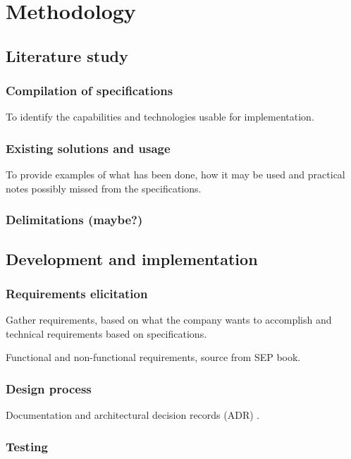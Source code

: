\chapter{Methodology}

\section{Literature study}

\subsection{Compilation of specifications}

To identify the capabilities and technologies usable for
implementation.

\subsection{Existing solutions and usage}

To provide examples of what has been done, how it may be used and
practical notes possibly missed from the specifications.

\subsection{Delimitations (maybe?)}

\section{Development and implementation}

\subsection{Requirements elicitation}

Gather requirements, based on what the company wants to
accomplish and technical requirements based on specifications.

Functional and non-functional requirements, source from 
SEP book.

\subsection{Design process}

Documentation and architectural decision records (ADR)
\cite{adr, adr-github}.

\subsection{Testing}

